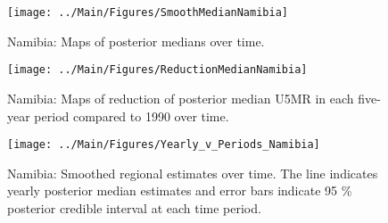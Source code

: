 \documentclass[12pt]{article}\usepackage[]{graphicx}\usepackage[]{color}
\newenvironment{knitrout}{}{} %
\begin{document}
\begin{knitrout}
\color{fgcolor}\begin{figure}[bht]

{\centering \texttt{[image: ../Main/Figures/SmoothMedianNamibia]} 

}

\caption[Namibia]{Namibia: Maps of posterior medians over time.}\label{fig:unnamed-chunk-244}
\end{figure}


\end{knitrout}
\begin{knitrout}
\color{fgcolor}\begin{figure}[bht]

{\centering \texttt{[image: ../Main/Figures/ReductionMedianNamibia]} 

}

\caption[Namibia]{Namibia: Maps of reduction of posterior median U5MR in each five-year period compared to 1990 over time.}\label{fig:unnamed-chunk-245}
\end{figure}


\end{knitrout}
\begin{knitrout}
\color{fgcolor}\begin{figure}[bht]

{\centering \texttt{[image: ../Main/Figures/Yearly\_v\_Periods\_Namibia]} 

}

\caption[Namibia]{Namibia: Smoothed regional estimates over time. The line indicates yearly posterior median estimates and error bars indicate 95 \% posterior credible interval at each time period.}\label{fig:unnamed-chunk-246}
\end{figure}


\end{knitrout}
\end{document}
